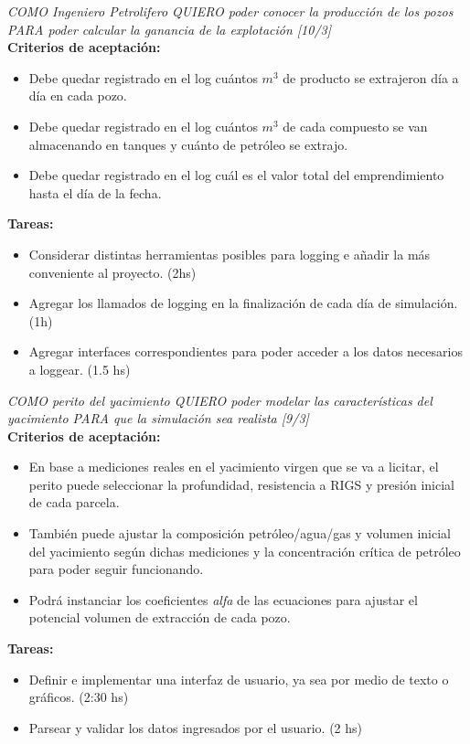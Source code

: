 \begin{tcolorbox}
\textit{COMO Ingeniero Petrolifero QUIERO poder conocer la producción de los pozos PARA poder calcular la ganancia de la explotación [10/3]}\\

\textbf{Criterios de aceptación:}
\begin{itemize}
	\item Debe quedar registrado en el log cuántos $m^3$ de producto se extrajeron día a día en cada pozo.
    \item Debe quedar registrado en el log cuántos $m^3$ de cada compuesto se van almacenando en tanques y cuánto de petróleo se extrajo. 
    \item Debe quedar registrado en el log cuál es el valor total del emprendimiento hasta el día de la fecha.  
\end{itemize}

\textbf{Tareas:}
\begin{itemize}
	\item Considerar distintas herramientas posibles para logging e añadir la más conveniente al proyecto. (2hs) 
    \item Agregar los llamados de logging en la finalización de cada día de simulación. (1h)
    \item Agregar interfaces correspondientes para poder acceder a los datos necesarios a loggear. (1.5 hs)  
\end{itemize}
\end{tcolorbox}

\begin{tcolorbox}
\textit{COMO perito del yacimiento QUIERO poder modelar las características del yacimiento PARA que la simulación sea realista [9/3]}\\

\textbf{Criterios de aceptación:}
\begin{itemize}
	\item En base a mediciones reales en el yacimiento virgen que se va a licitar, el perito puede seleccionar la profundidad, resistencia a RIGS y presión inicial de cada parcela.

    \item También puede ajustar la composición petróleo/agua/gas y volumen inicial del yacimiento según dichas mediciones y la concentración crítica de petróleo para poder seguir funcionando.

    \item Podrá instanciar los coeficientes \textit{alfa} de las ecuaciones para ajustar el potencial volumen de extracción de cada pozo.
\end{itemize}

\textbf{Tareas:}
\begin{itemize}
	\item Definir e implementar una interfaz de usuario, ya sea por medio de texto o gráficos. (2:30 hs)
    \item Parsear y validar los datos ingresados por el usuario. (2 hs)
\end{itemize}
\end{tcolorbox}
